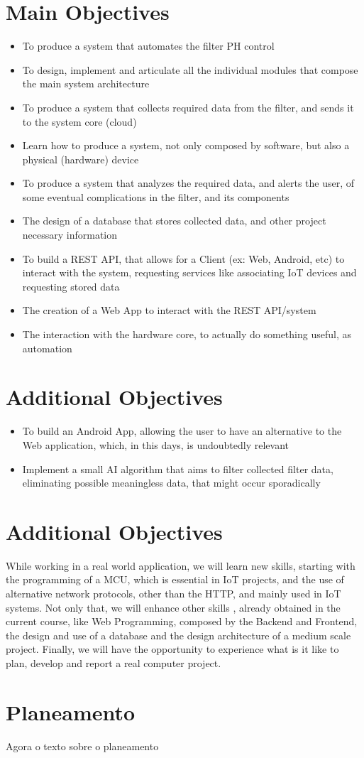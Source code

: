 \documentclass[a4paper,twoside,11pt]{article}
\begin{document}
\section*{Main Objectives}
\begin{itemize}
  \item To produce a system that automates the filter PH control
  \item To design, implement and articulate all the individual modules that compose the main system architecture
  \item To produce a system that collects required data from the filter, and sends it to the system core (cloud)
  \item Learn how to produce a system, not only composed by software, but also a physical (hardware) device
  \item To produce a system that analyzes the required data, and alerts the user, of some eventual complications in the filter, and its components
  \item The design of a database that stores collected data, and other project necessary information
  \item To build a REST API, that allows for a Client (ex: Web, Android, etc) to interact with the system, requesting services like associating IoT devices and requesting stored data
  \item The creation of a Web App to interact with the REST API/system
  \item The interaction with the hardware core, to actually do something useful, as automation
\end{itemize}

\section*{Additional Objectives}
\begin{itemize}
  \item To build an Android App, allowing the user to have an alternative to the Web application, which, in this days, is undoubtedly relevant
  \item Implement a small AI algorithm that aims to filter collected filter data, eliminating possible meaningless data, that might occur sporadically
\end{itemize}

\section*{Additional Objectives}
While working in a real world application, we will learn new skills, starting with the programming of a MCU, which is essential in IoT projects, and the use of alternative network protocols, other than the HTTP, and mainly used in IoT systems. Not only that, we will enhance other skills , already obtained in the current course, like Web Programming, composed by the Backend and Frontend, the design and use of a database and the design architecture of a medium scale project. Finally, we will have the opportunity to experience what is it like to plan, develop and report a real computer project.

\section*{Planeamento}
Agora o texto sobre o planeamento



\end{document}
